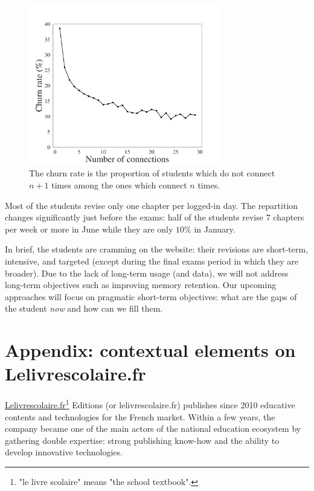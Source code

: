 \begin{figure}[!ht]
\centering
\includegraphics[clip, width= 0.75\textwidth]{1literature/fig/churn.pdf}
\caption{The churn rate is the proportion of students which do not connect $n+1$ times among the ones which connect $n$ times.}
\label{fig:churn}
\end{figure}

Most of the students revise only one chapter per logged-in day. The repartition changes significantly just before the exams: half of the students revise 7 chapters per week or more in June while they are only $10\%$ in January. 

In brief, the students are cramming on the website: their revisions are short-term, intensive, and targeted (except during the final exams period in which they are broader). Due to the lack of long-term usage (and data), we will not address long-term objectives such as improving memory retention. Our upcoming approaches will focus on pragmatic short-term objectives: what are the gaps of the student \emph{now} and how can we fill them.


\section{Appendix: contextual elements on Lelivrescolaire.fr}
\label{sec:lls}
\href{https://www.lelivrescolaire.fr}{Lelivrescolaire.fr}\footnote{"le livre scolaire" means "the school textbook".} Editions (or lelivrescolaire.fr) publishes since 2010 educative contents and technologies for the French market. Within a few years, the company became one of the main actors of the national education ecosystem by gathering double expertise: strong publishing know-how and the ability to develop innovative technologies. 

